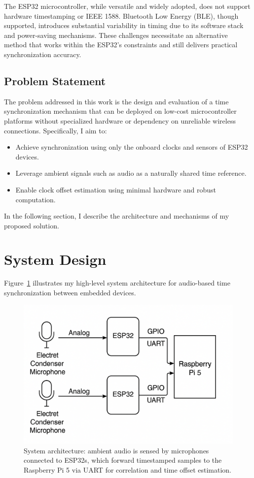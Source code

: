 \documentclass[sigconf]{acmart}
\begin{document}
The ESP32 microcontroller, while versatile and widely adopted, does not support hardware timestamping or IEEE 1588. Bluetooth Low Energy (BLE), though supported, introduces substantial variability in timing due to its software stack and power-saving mechanisms. These challenges necessitate an alternative method that works within the ESP32’s constraints and still delivers practical synchronization accuracy.

\subsection{Problem Statement}
The problem addressed in this work is the design and evaluation of a time synchronization mechanism that can be deployed on low-cost microcontroller platforms without specialized hardware or dependency on unreliable wireless connections. Specifically, I aim to:
\begin{itemize}
    \item Achieve synchronization using only the onboard clocks and sensors of ESP32 devices.
    \item Leverage ambient signals such as audio as a naturally shared time reference.
    \item Enable clock offset estimation using minimal hardware and robust computation.
\end{itemize}

\noindent In the following section, I describe the architecture and mechanisms of my proposed solution.

\section{System Design}
Figure~\ref{fig:system-diagram} illustrates my high-level system architecture for audio-based time synchronization between embedded devices.

\begin{figure}[H]
    \centering
    \includegraphics[width=\linewidth]{system_diagram.png}
    \caption{System architecture: ambient audio is sensed by microphones connected to ESP32s, which forward timestamped samples to the Raspberry Pi 5 via UART for correlation and time offset estimation.}
    \label{fig:system-diagram}
\end{figure}
\end{document}
